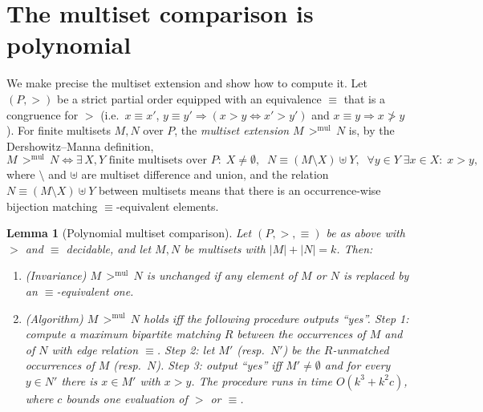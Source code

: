 \documentclass{amsart}
\newtheorem{lemma}{Lemma}
\theoremstyle{definition}
\theoremstyle{remark}
\begin{document}
\section{The multiset comparison is polynomial}

We make precise the multiset extension and show how to compute it. Let $(P,>)$ be
a strict partial order equipped with an equivalence $\equiv$ that is a congruence
for $>$ (i.e.\ $x\equiv x'$, $y\equiv y'\Rightarrow(x>y\iff x'>y')$ and
$x\equiv y\Rightarrow x\not> y$). For finite multisets $M,N$ over $P$, the
\emph{multiset extension} $M\,{>}^{\mathrm{mul}}\,N$ is, by the
Dershowitz--Manna definition,
\[
M\,{>}^{\mathrm{mul}}\,N \iff
\exists\, X,Y \text{ finite multisets over } P:\;
X\neq\emptyset,\;\;
N \equiv (M\setminus X)\uplus Y,\;\;
\forall y\in Y\;\exists x\in X:\; x>y,
\tag{$\star$}
\]
where $\setminus$ and $\uplus$ are multiset difference and union, and the
relation $N\equiv(M\setminus X)\uplus Y$ between multisets means that there is an
occurrence-wise bijection matching $\equiv$-equivalent elements.

\begin{lemma}[Polynomial multiset comparison]\label{lem:mul}
Let $(P,>,\equiv)$ be as above with $>$ and $\equiv$ decidable, and let $M,N$ be
multisets with $|M|+|N|=k$. Then:
\begin{enumerate}
\item[\textup{(a)}] (Invariance) $M\,{>}^{\mathrm{mul}}\,N$ is unchanged if any
element of $M$ or $N$ is replaced by an $\equiv$-equivalent one.
\item[\textup{(b)}] (Algorithm) $M\,{>}^{\mathrm{mul}}\,N$ holds iff the following
procedure outputs ``yes''. \emph{Step 1:} compute a maximum bipartite matching
$R$ between the occurrences of $M$ and of $N$ with edge relation $\equiv$.
\emph{Step 2:} let $M'$ (resp.\ $N'$) be the $R$-unmatched occurrences of $M$
(resp.\ $N$). \emph{Step 3:} output ``yes'' iff $M'\neq\emptyset$ and for every
$y\in N'$ there is $x\in M'$ with $x>y$. The procedure runs in time
$O(k^{3}+k^{2}c)$, where $c$ bounds one evaluation of $>$ or $\equiv$.
\end{enumerate}
\end{lemma}
\end{document}
